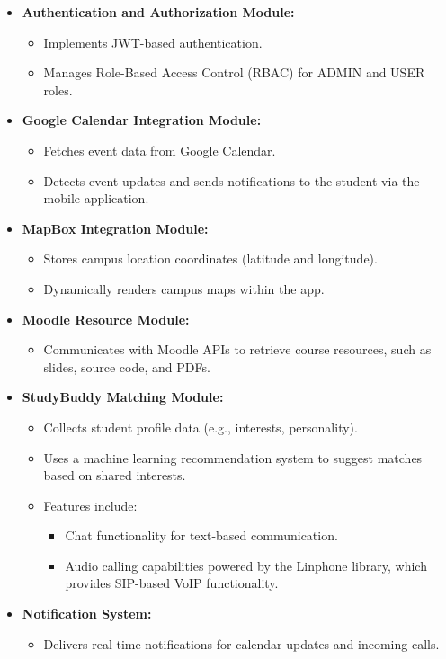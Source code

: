 \documentclass{article}
\begin{document}
\begin{itemize}  
    \item \textbf{Authentication and Authorization Module:}  
    \begin{itemize}  
        \item Implements JWT-based authentication.  
        \item Manages Role-Based Access Control (RBAC) for ADMIN and USER roles.  
    \end{itemize}  

    \item \textbf{Google Calendar Integration Module:}  
    \begin{itemize}  
        \item Fetches event data from Google Calendar.  
        \item Detects event updates and sends notifications to the student via the mobile application.  
    \end{itemize}  

    \item \textbf{MapBox Integration Module:}  
    \begin{itemize}  
        \item Stores campus location coordinates (latitude and longitude).  
        \item Dynamically renders campus maps within the app.  
    \end{itemize}  

    \item \textbf{Moodle Resource Module:}  
    \begin{itemize}  
        \item Communicates with Moodle APIs to retrieve course resources, such as slides, source code, and PDFs.  
    \end{itemize}  

    \item \textbf{StudyBuddy Matching Module:}  
    \begin{itemize}  
        \item Collects student profile data (e.g., interests, personality).  
        \item Uses a machine learning recommendation system to suggest matches based on shared interests.  
        \item Features include:  
        \begin{itemize}  
            \item Chat functionality for text-based communication.  
            \item Audio calling capabilities powered by the Linphone library, which provides SIP-based VoIP functionality.  
        \end{itemize}  
    \end{itemize}  

    \item \textbf{Notification System:}  
    \begin{itemize}  
        \item Delivers real-time notifications for calendar updates and incoming calls.  
    \end{itemize}  
\end{itemize}
\end{document}
